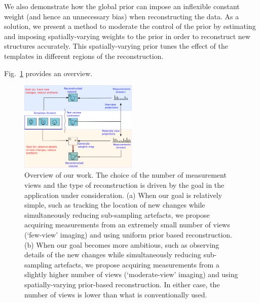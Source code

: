 \documentclass[journal]{IEEEtran}
\begin{document}

We also demonstrate how the global prior can impose an inflexible
constant weight (and hence an unnecessary bias) when reconstructing
the data. As a solution, we present a method to moderate the control
of the prior by estimating and imposing spatially-varying weights to
the prior in order to reconstruct new structures accurately. This
spatially-varying prior tunes the effect of the templates in different
regions of the reconstruction.

Fig.~\ref{fig:prior_overview} provides an overview.


 \begin{figure}[h]
\centering
	\includegraphics[width=0.5\textwidth]{../images/prior_cmb.png}
        \caption{Overview of our work. The choice of the number of
          measurement views and the type of reconstruction is driven
          by the goal in the application under consideration.  (a) When
          our goal is relatively simple, such as tracking the location
          of new changes while simultaneously reducing sub-sampling
          artefacts, we propose acquiring measurements from an
          extremely small number of views (`few-view' imaging) and
          using uniform prior based reconstruction. (b) When our goal
          becomes more ambitious, such as observing details of the new
          changes while simultaneously reducing sub-sampling
          artefacts, we propose acquiring measurements from a
          slightly higher number of views (`moderate-view' imaging)
          and using spatially-varying prior-based reconstruction. In
          either case, the number of views is lower than what is
          conventionally used.}
 \label{fig:prior_overview}
\end{figure}
\end{document}
